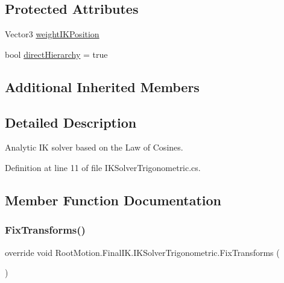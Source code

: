 \subsection*{Protected Attributes}
\begin{DoxyCompactItemize}
\item 
Vector3 \mbox{\hyperlink{class_root_motion_1_1_final_i_k_1_1_i_k_solver_trigonometric_adab128ae2e20a68d5b4f948c486f4ccf}{weight\+I\+K\+Position}}
\item 
bool \mbox{\hyperlink{class_root_motion_1_1_final_i_k_1_1_i_k_solver_trigonometric_a7a81908ec1418ad740d65d07aef37466}{direct\+Hierarchy}} = true
\end{DoxyCompactItemize}
\subsection*{Additional Inherited Members}


\subsection{Detailed Description}
Analytic IK solver based on the Law of Cosines. 



Definition at line 11 of file I\+K\+Solver\+Trigonometric.\+cs.



\subsection{Member Function Documentation}
\mbox{\label{class_root_motion_1_1_final_i_k_1_1_i_k_solver_trigonometric_a46aa3acfba8c4c23dc23f00f29249d90}} 
\subsubsection{\texorpdfstring{Fix\+Transforms()}{FixTransforms()}}
{\footnotesize\ttfamily override void Root\+Motion.\+Final\+I\+K.\+I\+K\+Solver\+Trigonometric.\+Fix\+Transforms (\begin{DoxyParamCaption}{ }\end{DoxyParamCaption})\hspace{0.3cm}{\ttfamily [virtual]}}



